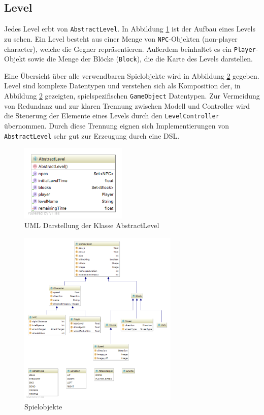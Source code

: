 \subsection{Level}
\label{sub:architektur:level}

Jedes Level erbt von \texttt{AbstractLevel}.
In Abbildung \ref{fig:spielarchitektur:abstractlevel} ist der Aufbau eines Levels zu sehen.
Ein Level besteht aus einer Menge von \texttt{NPC}-Objekten (non-player character), welche die Gegner repräsentieren.
Außerdem beinhaltet es ein \texttt{Player}-Objekt sowie die Menge der Blöcke (\texttt{Block}), die die Karte des Levels darstellen.

Eine Übersicht über alle verwendbaren Spielobjekte wird in Abbildung \ref{fig:spielarchitektur:model} gegeben.
Level sind komplexe Datentypen und verstehen sich als Komposition der, in Abbildung \ref{fig:spielarchitektur:model} gezeigten, spielspezifischen \texttt{GameObject} Datentypen.
Zur Vermeidung von Redundanz und zur klaren Trennung zwischen Modell und Controller wird die Steuerung der Elemente eines Levels durch den \texttt{LevelController} übernommen.
Durch diese Trennung eignen sich Implementierungen von \texttt{AbstractLevel} sehr gut zur Erzeugung durch eine DSL.

\begin{figure}[]
\centering
\includegraphics[width=2in]{img/05_abstractlevel_uml.png}
\caption{UML Darstellung der Klasse AbstractLevel}
\label{fig:spielarchitektur:abstractlevel}
\end{figure}

\begin{figure}[]
\centering
\includegraphics[width=3in]{img/05_model.png}
\caption{Spielobjekte}
\label{fig:spielarchitektur:model}
\end{figure}

